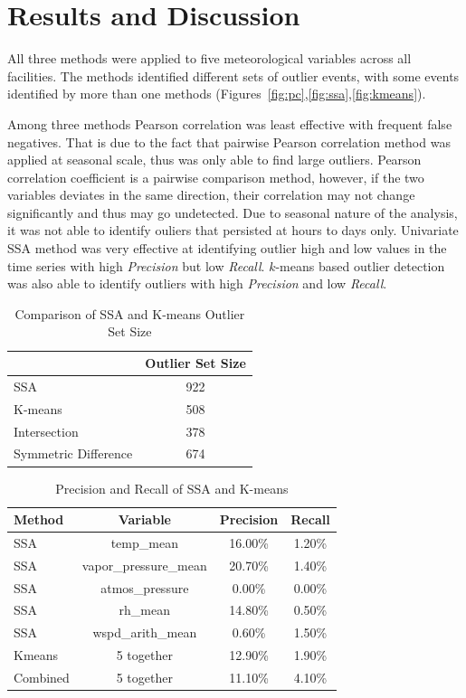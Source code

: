 \section{Results and Discussion}
All three methods were applied to five meteorological variables across
all facilities. The methods identified different sets of outlier events,
with some events identified by more than one methods
(Figures~\ref{fig:pc},\ref{fig:ssa},\ref{fig:kmeans}).

Among three methods Pearson correlation was least effective with
frequent false negatives.
That is due to the fact that pairwise Pearson correlation method was 
applied at seasonal scale, thus was only able to find large outliers.
Pearson correlation coefficient is a pairwise comparison method, however, 
if the two variables deviates in the same direction, their correlation 
may not change significantly and thus may go undetected. Due to seasonal
nature of the analysis, it was not able to identify ouliers that
persisted at hours to days only.
Univariate SSA method was very effective at identifying outlier high and
low values in the time series with high \textit{Precision} but low \textit{Recall}. 
$k$-means based outlier detection was also able to identify outliers
with high \textit{Precision} and low \textit{Recall}. 



\begin{table}[ht]
\caption{Comparison of SSA and K-means Outlier Set Size}
\label{tab:comp}
\centering
\begin{tabular}{|l|c|}
\cline{2-2}
\multicolumn{1}{l|}{} & Outlier Set Size\\
\hline
SSA & 922\\
K-means & 508\\
Intersection & 378\\
Symmetric Difference & 674\\
\hline
\end{tabular}
\end{table}

\begin{table}[ht]
\caption{Precision and Recall of SSA and K-means}
\label{tab:pr}
\centering
\begin{tabular}{|l|c|c|c|}
\hline
Method & Variable & Precision & Recall\\
\hline
SSA & temp\_mean & 16.00\% & 1.20\%\\
SSA & vapor\_pressure\_mean & 20.70\% & 1.40\%\\
SSA & atmos\_pressure & 0.00\% & 0.00\%\\
SSA & rh\_mean & 14.80\% & 0.50\%\\
SSA & wspd\_arith\_mean & 0.60\% & 1.50\%\\
Kmeans & 5 together & 12.90\% & 1.90\%\\
Combined & 5 together & 11.10\% & 4.10\%\\
\hline
\end{tabular}
\end{table}

